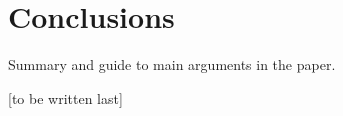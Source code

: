 \section{Conclusions}\label{sec:conclusions}

Summary and guide to main arguments in the paper.

[to be written last]

